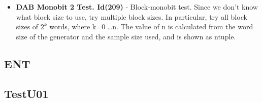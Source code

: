 \begin{itemize}
   \item \textbf{DAB Monobit 2 Test. Id(209)} - Block-monobit test. Since we don't know what block size to use, try multiple block sizes. In particular, try all block sizes of $2^k$ words, where k={0 \dots n}.  The value of n is calculated from the word size of the generator and the sample size used, and is shown as ntuple.
 \end{itemize} 

  \subsection{ENT}
  
  \subsection{TestU01}
  

\begin{center}
\end{center}
